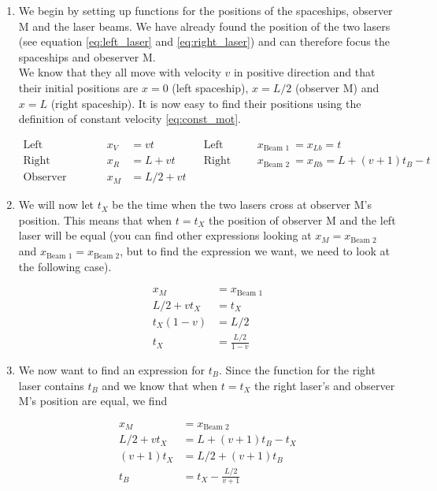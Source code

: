 \documentclass[a4paper,10pt,english]{article}
\begin{document}
\begin{enumerate}
\item We begin by setting up functions for the positions of the spaceships, observer M and the laser beams. We have already found the position of the two lasers (see equation \ref{eq:left_laser} and \ref{eq:right_laser}) and can therefore focus the spaceships and obeserver M.
\\
We know that they all move with velocity $v$ in positive direction and that their initial positions are $x=0$ (left spaceship), $x=L/2$ (observer M) and $x=L$ (right spaceship). It is now easy to find their positions using the definition of constant velocity \ref{eq:const_mot}.

\begin{align*}
\text{Left spaceship:}& &&& x_{V}&=vt && \text{Left laser:}& && x_{\text{Beam 1}}&=x_{Lb}=t\\
\text{Right spaceship:}& &&& x_{R}&=L+vt && \text{Right laser:}& && x_{\text{Beam 2}}&=x_{Rb}=L+(v+1)t_{B}-t\\
\text{Observer M:}& &&& x_{M}&=L/2+vt
\end{align*}

\item We will now let $t_{X}$ be the time when the two lasers cross at observer M's position. This means that when $t=t_{X}$ the position of observer M and the left laser will be equal (you can find other expressions looking at $x_{M}=x_{\text{Beam 2}}$ and $x_{\text{Beam 1}}=x_{\text{Beam 2}}$, but to find the expression we want, we need to look at the following case).

\begin{align*}
x_{M}&=x_{\text{Beam 1}}\\
L/2+vt_{X}&=t_{X}\\
t_{X}(1-v)&=L/2\\
t_{X}&=\frac{L/2}{1-v}
\end{align*}

\item We now want to find an expression for $t_{B}$. Since the function for the right laser contains $t_{B}$ and we know that when $t=t_{X}$ the right laser's and observer M's position are equal, we find

\begin{align*}
x_{M}&=x_{\text{Beam 2}}\\
L/2+vt_{X}&=L+(v+1)t_{B}-t_{X}\\
(v+1)t_{X}&=L/2+(v+1)t_{B}\\
t_{B}&=t_{X}-\frac{L/2}{v+1}
\end{align*}


\end{enumerate}
\end{document}
